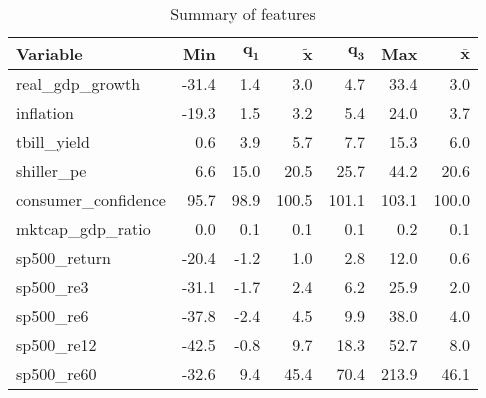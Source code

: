 \begin{table}[ht]
\centering
\begingroup\normalsize
\begin{tabular}{lrrrrrr}
 \textbf{Variable} & \textbf{Min} & $\mathbf{q_1}$ & $\mathbf{\widetilde{x}}$ & $\mathbf{q_3}$ & \textbf{Max} & $\mathbf{\bar{x}}$ \\ 
  \hline
real\_gdp\_growth & -31.4 &  1.4 &   3.0 &   4.7 &  33.4 &   3.0 \\ 
  inflation & -19.3 &  1.5 &   3.2 &   5.4 &  24.0 &   3.7 \\ 
  tbill\_yield &   0.6 &  3.9 &   5.7 &   7.7 &  15.3 &   6.0 \\ 
  shiller\_pe &   6.6 & 15.0 &  20.5 &  25.7 &  44.2 &  20.6 \\ 
  consumer\_confidence &  95.7 & 98.9 & 100.5 & 101.1 & 103.1 & 100.0 \\ 
  mktcap\_gdp\_ratio &   0.0 &  0.1 &   0.1 &   0.1 &   0.2 &   0.1 \\ 
  sp500\_return & -20.4 & -1.2 &   1.0 &   2.8 &  12.0 &   0.6 \\ 
  sp500\_re3 & -31.1 & -1.7 &   2.4 &   6.2 &  25.9 &   2.0 \\ 
  sp500\_re6 & -37.8 & -2.4 &   4.5 &   9.9 &  38.0 &   4.0 \\ 
  sp500\_re12 & -42.5 & -0.8 &   9.7 &  18.3 &  52.7 &   8.0 \\ 
  sp500\_re60 & -32.6 &  9.4 &  45.4 &  70.4 & 213.9 &  46.1 \\ 
  \end{tabular}
\endgroup
\caption{Summary of features} 
\label{tab:features}
\end{table}
